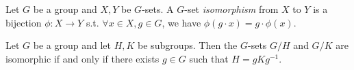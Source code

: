 \begin{definition} 
  Let $G$ be a group and $X,Y$ be $G$-sets. A $G$-set \emph{isomorphism} from $X$ to $Y$ is a bijection
  $\phi:X\to Y$ s.t. $\forall x\in X, g\in G$, we have $\phi(g\cdot x)=g\cdot \phi(x)$.
  \label{defi:isomorphismAction}
\end{definition}

\begin{theorem}
  Let $G$ be a group and let $H,K$ be subgroups. Then the $G$-sets $G/H$ and $G/K$ are isomorphic if and only if there exists $g\in G$ such that $H=gKg^{-1}$.
  \label{thm:cosetsIsomorphic}
\end{theorem}



  
  
  
  



